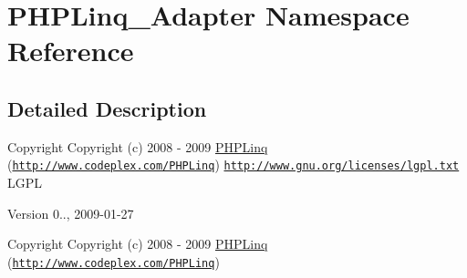 \hypertarget{namespace_p_h_p_linq___adapter}{\section{\-P\-H\-P\-Linq\-\_\-\-Adapter \-Namespace \-Reference}
\label{namespace_p_h_p_linq___adapter}
}


\subsection{\-Detailed \-Description}
\begin{DoxyCopyright}{\-Copyright}
\-Copyright (c) 2008 -\/ 2009 \hyperlink{namespace_p_h_p_linq}{\-P\-H\-P\-Linq} (\href{http://www.codeplex.com/PHPLinq}{\tt http\-://www.\-codeplex.\-com/\-P\-H\-P\-Linq})  \href{http://www.gnu.org/licenses/lgpl.txt}{\tt http\-://www.\-gnu.\-org/licenses/lgpl.\-txt} \-L\-G\-P\-L 
\end{DoxyCopyright}
\begin{DoxyVersion}{\-Version}
0.., 2009-\/01-\/27
\end{DoxyVersion}
\begin{DoxyCopyright}{\-Copyright}
\-Copyright (c) 2008 -\/ 2009 \hyperlink{namespace_p_h_p_linq}{\-P\-H\-P\-Linq} (\href{http://www.codeplex.com/PHPLinq}{\tt http\-://www.\-codeplex.\-com/\-P\-H\-P\-Linq}) 
\end{DoxyCopyright}
